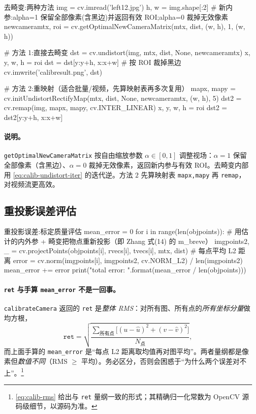\begin{codebox}[Python]{去畸变:两种方法}
img = cv.imread('left12.jpg')
h, w = img.shape[:2]
# 新内参:alpha=1 保留全部像素(含黑边)并返回有效 ROI;alpha=0 裁掉无效像素
newcameramtx, roi = cv.getOptimalNewCameraMatrix(mtx, dist, (w, h), 1, (w, h))

# 方法 1:直接去畸变
dst = cv.undistort(img, mtx, dist, None, newcameramtx)
x, y, w, h = roi
dst = dst[y:y+h, x:x+w]          # 按 ROI 裁掉黑边
cv.imwrite('calibresult.png', dst)

# 方法 2:重映射（适合批量/视频，先算映射表再多次复用）
mapx, mapy = cv.initUndistortRectifyMap(mtx, dist, None, newcameramtx, (w, h), 5)
dst2 = cv.remap(img, mapx, mapy, cv.INTER_LINEAR)
x, y, w, h = roi
dst2 = dst2[y:y+h, x:x+w]
\end{codebox}

\paragraph{说明。}
\texttt{getOptimalNewCameraMatrix} 按自由缩放参数 $\alpha\in[0,1]$ 调整视场：$\alpha=1$ 保留全部像素（含黑边）、$\alpha=0$ 裁掉无效像素，返回新内参与有效 ROI。去畸变内部用 \cref{eq:calib-undistort-iter} 的迭代逆。方法 $2$ 先算映射表 \texttt{mapx,mapy} 再 \texttt{remap}，对视频流更高效。

\subsection{重投影误差评估}

\begin{codebox}[Python]{重投影误差:标定质量评估}
mean_error = 0
for i in range(len(objpoints)):
    # 用估计的内外参 + 畸变把物点重新投影（即 Zhang 式(14) 的 m_breve）
    imgpoints2, _ = cv.projectPoints(objpoints[i], rvecs[i], tvecs[i], mtx, dist)
    # 每点平均 L2 距离
    error = cv.norm(imgpoints[i], imgpoints2, cv.NORM_L2) / len(imgpoints2)
    mean_error += error
print("total error: {}".format(mean_error / len(objpoints)))
\end{codebox}

\paragraph{\texttt{ret} 与手算 \texttt{mean\_error} 不是一回事。}
\texttt{calibrateCamera} 返回的 \texttt{ret} 是\emph{整体 RMS}：对所有图、所有点的\emph{所有坐标分量}做均方根，
\begin{equation}
  \texttt{ret}=\sqrt{\frac{\sum_{\text{所有点}}\big[(u-\hat u)^2+(v-\hat v)^2\big]}{N_{\text{点}}}},
  \label{eq:calib-rms}
\end{equation}
而上面手算的 \texttt{mean\_error} 是“每点 L2 距离取均值再对图平均”。两者量纲都是像素但\emph{数值不同}（RMS $\ge$ 平均）。务必区分，否则会困惑于“为什么两个误差对不上”。\footnote{\cref{eq:calib-rms} 给出与 \texttt{ret} 量纲一致的形式；其精确归一化常数为 OpenCV 源码级细节，以源码为准。}

